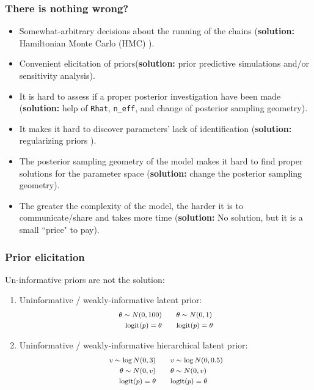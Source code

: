 \documentclass[nonav,sleutel]{beamer}
\begin{document}
	\begin{frame}
		\frametitle{There is nothing wrong?}
		\begin{itemize}
			\item Somewhat-arbitrary decisions about the running of the chains (\textbf{solution:} Hamiltonian Monte Carlo (HMC) \cite{Betancourt_et_al_2013} ).
			\item Convenient elicitation of priors(\textbf{solution:} prior predictive simulations and/or sensitivity analysis).
			\item It is hard to assess if a proper posterior investigation have been made \cite{Gelman_et_al_1996a}
			(\textbf{solution:} help of \texttt{Rhat}, \texttt{n\_eff}, and change of posterior sampling geometry).
			\item It makes it hard to discover parameters' lack of identification \cite{Skrondal_et_al_2004a} (\textbf{solution:} regularizing priors ).
			\item The posterior sampling geometry of the model makes it hard to find proper solutions for the parameter space \cite{Betancourt_et_al_2013} (\textbf{solution:} change the posterior sampling geometry).
			\item The greater the complexity of the model, the harder it is to communicate/share and takes more time
			(\textbf{solution:} No solution, but it is a small ``price" to pay).
		\end{itemize}
	\end{frame}
	\begin{frame}
		\frametitle{Prior elicitation}
		Un-informative priors are not the solution:
		\begin{enumerate}
			\item Uninformative / weakly-informative latent prior:
			\begin{equation*} \label{eq:prior_el1}
				\footnotesize
				\begin{split}	
					\theta \sim N(0, 100) \quad & \quad \theta \sim N(0, 1) \\
					\text{logit}(p) = \theta \quad & \quad \text{logit}(p) = \theta
				\end{split}
			\end{equation*}
			\item Uninformative / weakly-informative hierarchical latent prior:
			\begin{equation*} \label{eq:prior_el2}
				\footnotesize
				\begin{split}
					v \sim \log N(0, 3) \quad & \quad v \sim \log N(0, 0.5) \\	
					\theta \sim N(0, v) \quad & \quad \theta \sim N(0, v) \\
					\text{logit}(p) = \theta \quad & \quad \text{logit}(p) = \theta
				\end{split}
			\end{equation*}
		\end{enumerate}
	\end{frame}
\end{document}
